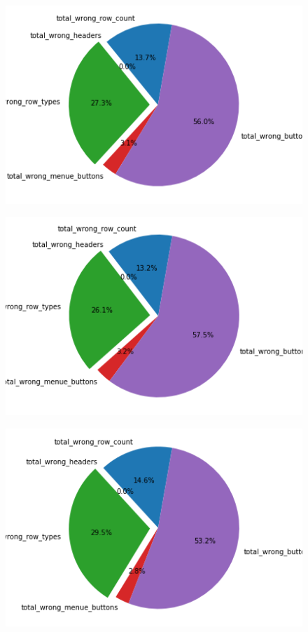\documentclass[pdftex,a4paper,halfparskip, article]{scrartcl}
\begin{document}
\begin{figure}
\centering
\begin{minipage}{.33\textwidth}
  \centering
  \includegraphics[width=1\linewidth]{predictions_bin14_total_error_types_pie_chart}
  \label{fig:fehler_gesamt_bin14}
\end{minipage}%
\begin{minipage}{.33\textwidth}
  \centering
  \includegraphics[width=1\linewidth]{predictions_bin14_excluded_p80_error_types_pie_chart}
  \label{fig:fehler_beste80_bin14}
\end{minipage}
\begin{minipage}{.33\textwidth}
  \centering
   \includegraphics[width=1\linewidth]{predictions_bin14_p80_error_types_pie_chart}

\end{minipage}
\end{figure}
\end{document}
